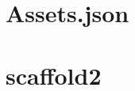 \begin{appendices}
    \chapter{Assets.json}    
    \label{app:assetsjson}
    
    \chapter{scaffold2}    
    \label{app:usecasesprojectstructuur}
\end{appendices}